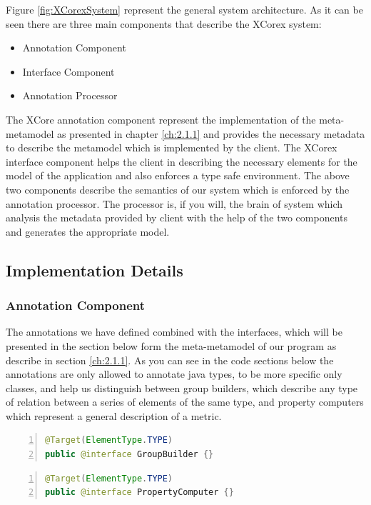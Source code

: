 	Figure \ref{fig:XCorexSystem} represent the  general system architecture. 
As it can be seen there are three main components that describe the XCorex
system:
	\begin{itemize}
	  \item Annotation Component
	  \item Interface  Component
	  \item Annotation Processor
	\end{itemize}
	The XCore annotation component represent the implementation of the
meta-metamodel as presented in chapter \ref{ch:2.1.1} and provides the necessary
metadata to describe the metamodel which is implemented by the client. 
	The XCorex interface component helps the client in describing the necessary
elements for the model of the application and also enforces a type safe environment.
	The above two components describe the semantics of our system which is enforced 
by the annotation processor. The processor is, if you will, the brain of system
which analysis the metadata provided by client with the help of the two
components and generates the appropriate model. 

\subsection{Implementation Details}

\subsubsection{Annotation Component}

	The annotations we have defined combined with the interfaces, which will be
presented in the section below form the meta-metamodel of our program as
describe in section \ref{ch:2.1.1}.
	As you can see in the code sections below the annotations are only allowed to
annotate java types, to be more specific only classes, and help us distinguish between
group builders, which describe any type of relation between a series of elements of the same type, and property
computers which represent a general description of a metric. 

		\small
	\begin{lstlisting}[language=Java,numbers=left]
@Target(ElementType.TYPE)
public @interface GroupBuilder {}	
	\end{lstlisting}
	\normalsize{} \label{codeSection:GroupBuild}
	
		\small
	\begin{lstlisting}[language=Java,numbers=left]
@Target(ElementType.TYPE)
public @interface PropertyComputer {}
	\end{lstlisting}
	\normalsize{} \label{codeSection:PropertyComputer} 

